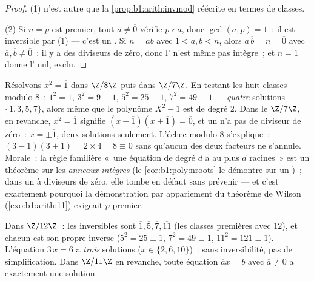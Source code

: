 \begin{proof}
(1) n'est autre que la \cref{prop:b1:arith:invmod} réécrite en termes de
classes.

(2) Si $n = p$ est premier, tout $\overline a \neq \overline 0$ vérifie
$p \nmid a$, donc $\gcd(a, p) = 1$~: il est inversible par (1) --- c'est
un . Si $n = ab$ avec $1 < a, b < n$, alors $\overline a\,
\overline b = \overline n = \overline 0$ avec $\overline a, \overline b
\neq \overline 0$~: il y a des diviseurs de zéro, donc l' n'est
même pas intègre~; et $n = 1$ donne l' nul, exclu.
\end{proof}

\begin{example}\label{ex:b1:structures:sqrtone}
Résolvons $x^2 = \overline 1$ dans $\Z/8\Z$ puis dans $\Z/7\Z$. En
testant les huit classes modulo $8$~: $1^2 = 1$, $3^2 = 9 \equiv 1$,
$5^2 = 25 \equiv 1$, $7^2 = 49 \equiv 1$ --- \emph{quatre} solutions
$\{\overline1, \overline3, \overline5, \overline7\}$, alors même que
le polynôme $X^2 - 1$ est de degré $2$. Dans le  $\Z/7\Z$,
en revanche, $x^2 = \overline1$ signifie $(x - \overline1)(x +
\overline1) = \overline0$, et un  n'a pas de diviseur de zéro~:
$x = \pm\overline1$, deux solutions seulement. L'échec modulo $8$
s'explique~: $(3-1)(3+1) = 2 \times 4 = 8 \equiv 0$ sans qu'aucun des
deux facteurs ne s'annule. Morale~: la règle familière «~une équation
de degré $d$ a au plus $d$ racines~» est un théorème sur les
\emph{anneaux intègres} (le \cref{cor:b1:poly:nroots} le démontre sur un
)~; dans un  à diviseurs de zéro, elle tombe en défaut sans
prévenir ---
et c'est exactement pourquoi la démonstration par appariement du
théorème de Wilson (\cref{exo:b1:arith:11}) exigeait $p$ premier.
\end{example}

\begin{example}\label{ex:b1:structures:zncomputation}
Dans $\Z/12\Z$~: les inversibles sont $\overline 1, \overline 5,
\overline 7, \overline{11}$ (les classes premières avec $12$), et chacun
est son propre inverse ($5^2 = 25 \equiv 1$, $7^2 = 49 \equiv 1$,
$11^2 = 121 \equiv 1$). L'équation $\overline 3\, x = \overline 6$ a
\emph{trois} solutions ($x \in \{\overline 2, \overline 6,
\overline{10}\}$)~: sans inversibilité, pas de simplification. Dans
$\Z/11\Z$ en revanche, toute équation $\overline a x = \overline b$ avec
$\overline a \neq \overline 0$ a exactement une solution.
\end{example}

